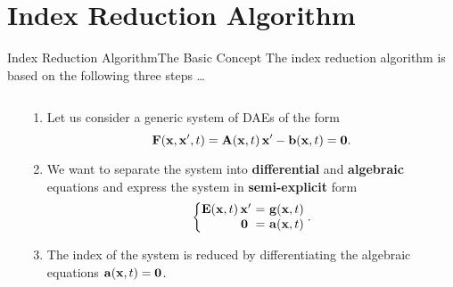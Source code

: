 
\section{Index Reduction Algorithm}

\begin{frame}{Index Reduction Algorithm}{The Basic Concept}
  The index reduction algorithm is based on the following three steps \dots
  \begin{columns}
    \begin{column}[c]{0.2\textwidth}
      \flushright
      \vspace{-2.5em}%
    \end{column}
    \begin{column}[c]{0.85\textwidth}
      \begin{enumerate}[<+->]
        \item Let us consider a generic system of \acp{DAE} of the form
        \begin{equation*}
          \mathbf{F}(\mathbf{x}, \mathbf{x}^\prime, t) = \mathbf{A}(\mathbf{x}, t) \, \mathbf{x}^\prime - \mathbf{b}(\mathbf{x}, t) = \mathbf{0} \text{.}
        \end{equation*}
        \item We want to separate the system into \textbf{differential} and \textbf{algebraic} equations and express the system in \textbf{semi-explicit} form
        \begin{equation*}
          \left\{\!\!\!\begin{array}{r@{~}c@{~}l}
            \mE \, \mxp &=& \mg \\
            \m{0}\phantom{\prime} &=& \ma
          \end{array}\!\!\!\right. \text{.}
        \end{equation*}
        \item The index of the system is reduced by differentiating the algebraic equations $\mathbf{a}(\mathbf{x}, t) = \mathbf{0}$.
      \end{enumerate}
    \end{column}
  \end{columns}
  \vspace{0.75em}
\end{frame}

